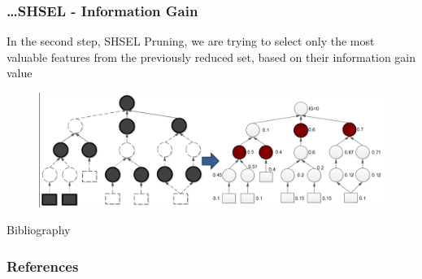 \documentclass{beamer}
\begin{document}
\begin{frame}
	\frametitle{\dots SHSEL - Information Gain}
	 In the second step, SHSEL Pruning, we are trying to select only the most valuable features from the previously reduced set, based on their information gain value
	\begin{figure}[tbph]
		\centering
		\includegraphics[width=1\linewidth]{figure/Mannheim/SHSEL_Phase2.png}
		\label{fig:SHSELPhase2}
	\end{figure}
\end{frame}
\begin{frame}[allowframebreaks]{Bibliography}
	\frametitle{References}
	
	
\end{frame}
\end{document}
